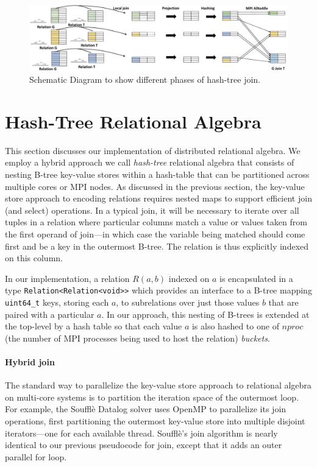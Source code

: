 

\begin{figure}[h]
	\includegraphics[width=\textwidth]{results/join_new.pdf}
	\caption{Schematic Diagram to show different phases of hash-tree join.}
	\label{fig:join}
\end{figure}



\section{Hash-Tree Relational Algebra}
\label{sec:impl}
%
This section discusses our implementation of distributed relational algebra. We employ a hybrid approach we call \emph{hash-tree} relational algebra that consists of nesting B-tree key-value stores within a hash-table that can be partitioned across multiple cores or MPI nodes. As discussed in the previous section, the key-value store approach to encoding relations requires nested maps to support efficient join (and select) operations. In a typical join, it will be necessary to iterate over all tuples in a relation where particular columns match a value or values taken from the first operand of join---in which case the variable being matched should come first and be a key in the outermost B-tree. The relation is thus explicitly indexed on this column.

In our implementation, a relation $R(a,b)$ indexed on $a$ is encapsulated in a type \texttt{Relation<Relation<void>>} which provides an interface to a B-tree mapping \texttt{uint64\_t} keys, storing each $a$, to subrelations over just those values $b$ that are paired with a particular $a$. In our approach, this nesting of B-trees is extended at the top-level by a hash table so that each value $a$ is also hashed to one of $\mathit{nproc}$ (the number of MPI processes being used to host the relation) \textit{buckets}.

\paragraph{Hybrid join} The standard way to parallelize the key-value store approach to relational algebra on multi-core systems is to partition the iteration space of the outermost loop. For example, the Souffl\`e Datalog solver uses OpenMP to parallelize its join operations, first partitioning the outermost key-value store into multiple disjoint iterators---one for each available thread. Souffl\`e's join algorithm is nearly identical to our previous pseudocode for join, except that it adds an outer parallel for loop.   

